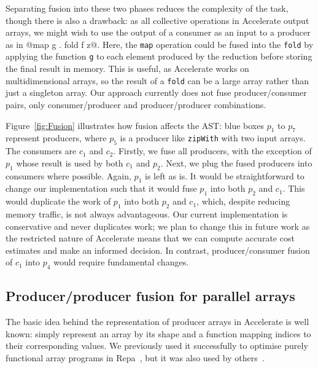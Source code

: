 %
Separating fusion into these two phases reduces the complexity of the task, though there is also a drawback: as all collective operations in Accelerate output arrays, we might wish to use the output of a consumer as an input to a producer as in @map g . fold f z@. Here, the \texttt{map} operation could be fused into the \texttt{fold} by applying the function \texttt{g} to each element produced by the reduction before storing the final result in memory. This is useful, as Accelerate works on multidimensional arrays, so the result of a \texttt{fold} can be a large array rather than just a singleton array. Our approach currently does not fuse producer/consumer pairs, only consumer/producer and producer/producer combinations. 

Figure~\ref{fig:Fusion} illustrates how fusion affects the AST: blue boxes $p_1$ to $p_7$ represent producers, where $p_5$ is a producer like \texttt{zipWith} with two input arrays. The consumers are $c_1$ and $c_2$. Firstly, we fuse all producers, with the exception of $p_1$ whose result is used by both $c_1$ and $p_2$. Next, we plug the fused producers into consumers where possible. Again, $p_1$ is left as is. It would be straightforward to change our implementation such that it would fuse $p_1$ into both $p_2$ and $c_1$. This would duplicate the work of $p_1$ into both $p_2$ and $c_1$, which, despite reducing memory traffic, is not always advantageous. Our current implementation is conservative and never duplicates work; we plan to change this in future work as the restricted nature of Accelerate means that we can compute accurate cost estimates and make an informed decision. In contrast, producer/consumer fusion of $c_1$ into $p_4$ would require fundamental changes.


\subsection{Producer/producer fusion for parallel arrays}

The basic idea behind the representation of producer arrays in Accelerate is well known: simply represent an array by its shape and a function mapping indices to their corresponding values. We previously used it successfully to optimise purely functional array programs in Repa~\cite{Keller:Repa}, but it was also used by others~\cite{Claessen:obsidian-expressive}.

